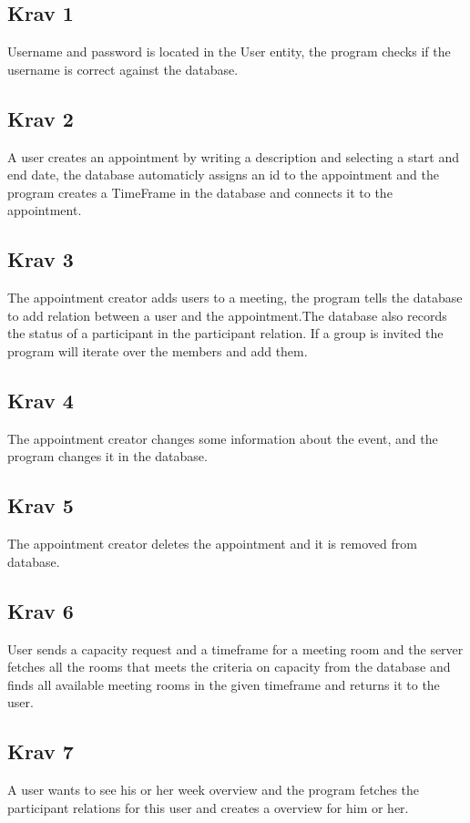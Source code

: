 \documentclass[a4paper, 10pt]{article}
\begin{document}


\subsection*{Krav 1}
Username and password is located in the User entity, the program checks if the username is correct against the database.

\subsection*{Krav 2}
A user creates an appointment by writing a description and selecting a start and end date, the database automaticly assigns an id to the appointment and the program creates a TimeFrame in the database and connects it to the appointment.

\subsection*{Krav 3}
The appointment creator adds users to a meeting, the program tells the database to add relation between a user and the appointment.The database also records the status of a participant in the participant relation. If a group is invited the program will iterate over the members and add them.

\subsection*{Krav 4}
The appointment creator changes some information about the event, and the program changes it in the database.

\subsection*{Krav 5}
The appointment creator deletes the appointment and it is removed from database.

\subsection*{Krav 6}
User sends a capacity request and a timeframe for a meeting room and the server fetches all the rooms that meets the criteria on capacity from the database and finds all available meeting rooms in the given timeframe and returns it to the user.

\subsection*{Krav 7}
A user wants to see his or her week overview and the program fetches the participant relations for this user and creates a overview for him or her.
\end{document}
